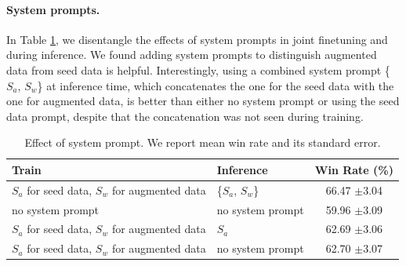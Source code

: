 \paragraph{System prompts.}
In Table \ref{tab:abl_system_prompt}, we disentangle the effects of system prompts in joint finetuning and during inference. We found adding system prompts to distinguish augmented data from seed data is helpful. Interestingly, using a combined system prompt \{$S_a$, $S_w$\} at inference time, which concatenates the one for the seed data with the one for augmented data, is better than either no system prompt or using the seed data prompt, despite that the concatenation was not seen during training.  
\begin{table}[t]
\caption{Effect of system prompt. We report mean win rate and its standard error.
\label{tab:abl_system_prompt}
}
  \centering
  \begin{tabular}{llc}
    \toprule
     \textbf{Train} & \textbf{Inference}    &  \textbf{Win Rate (\%)}  \\
    \midrule
    $S_a$ for seed data, $S_w$ for augmented data  & \{$S_a$, $S_w$\}  & 
66.47 $\pm$3.04 \\ 

    \midrule
   no system prompt  &  no system prompt & 59.96 $\pm$3.09   \\
    $S_a$ for seed data, $S_w$ for augmented data  & $S_a$ &  62.69 $\pm$3.06   \\
    $S_a$ for seed data, $S_w$ for augmented data   & no system prompt &   62.70 $\pm$3.07   \\
    
    \bottomrule
  \end{tabular}

\end{table}





